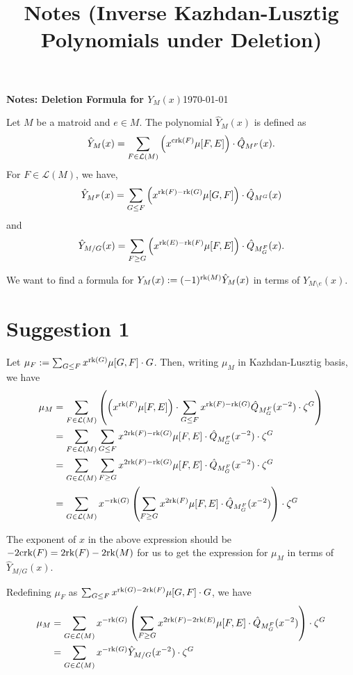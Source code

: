 \documentclass[11pt]{article}
\title{\texorpdfstring{Notes (Inverse Kazhdan-Lusztig Polynomials under Deletion)}{Notes (Inverse Kazhdan-Lusztig Polynomials under Deletion)}}
\newcommand{\calL}{\mathcal{L}}
\newcommand{\rank}{\normalfont\text{rk}}
\newcommand{\corank}{\normalfont\text{crk}}
\theoremstyle{remark}
\begin{document}
\textbf{Notes: Deletion Formula for $Y_M(x)$}\hfill {\small{\today}}

\hrulefill %

Let $M$ be a matroid and $e \in M$. The polynomial $\hat{Y}_M(x)$ is defined as
\[
    \hat{Y}_M(x)
    = \sum_{F \in \calL(M)} \left( x^{\corank(F)}\mu[F,E] \right) \cdot \hat{Q}_{M^F}(x).
\]
For $F\in\calL(M)$, we have,
\[
    \hat{Y}_{M^F}(x)
    = \sum_{G \leq F} \left( x^{\rank(F)-\rank(G)}\mu[G,F] \right) \cdot \hat{Q}_{M^G}(x)
\]
and
\[
    \hat{Y}_{M/G}(x)
    = \sum_{F \geq G} \left( x^{\rank(E)-\rank(F)}\mu[F,E] \right) \cdot \hat{Q}_{M^F_G}(x).
\]


We want to find a formula for $Y_M(x):=(-1)^{\rank(M)} \hat{Y}_M(x)$ in terms of $Y_{M\setminus e}(x)$.

\section*{Suggestion 1}
Let $\mu_F := \sum_{G \leq F} x^{\rank(G)}\mu[G,F]\cdot G$. Then, writing $\mu_M$ in Kazhdan-Lusztig basis, we have
\begin{align*}
    \mu_M & = \sum_{F \in \calL(M)} \left(\left( x^{\rank(F)}\mu[F,E] \right) \cdot \sum_{G \leq F} x^{\rank(F)-\rank(G)}\hat{Q}_{M_G^F}(x^{-2})\cdot \zeta^G \right) \\
          & = \sum_{F \in \calL(M)} \sum_{G \leq F} x^{2\rank(F)-\rank(G)}\mu[F, E]\cdot \hat{Q}_{M_G^F}(x^{-2})\cdot \zeta^G                                         \\
          & = \sum_{G \in \calL(M)} \sum_{F \geq G} x^{2\rank(F)-\rank(G)}\mu[F, E]\cdot \hat{Q}_{M_G^F}(x^{-2})\cdot \zeta^G                                         \\
          & = \sum_{G \in \calL(M)} x^{-\rank(G)}\left(\sum_{F \geq G} x^{2\rank(F)}\mu[F, E]\cdot \hat{Q}_{M_G^F}(x^{-2})\right)\cdot \zeta^G                        \\
\end{align*}

The exponent of $x$ in the above expression should be $-2\corank(F) = 2\rank(F) -2\rank(M)$ for us to get the
expression for $\mu_M$ in terms of $\hat{Y}_{M/G}(x)$.

Redefining $\mu_F$ as $\sum_{G \leq F} x^{\rank(G) - 2\rank(F)}\mu[G,F]\cdot G$, we have
\begin{align*}
    \mu_M & = \sum_{G \in \calL(M)} x^{-\rank(G)}\left(\sum_{F \geq G} x^{2\rank(F) - 2\rank(E)}\mu[F, E]\cdot \hat{Q}_{M_G^F}(x^{-2})\right)\cdot \zeta^G \\
          & = \sum_{G \in \calL(M)} x^{-\rank(G)}\hat{Y}_{M/G}(x^{-2})\cdot \zeta^G                                                                        \\
\end{align*}
\end{document}
